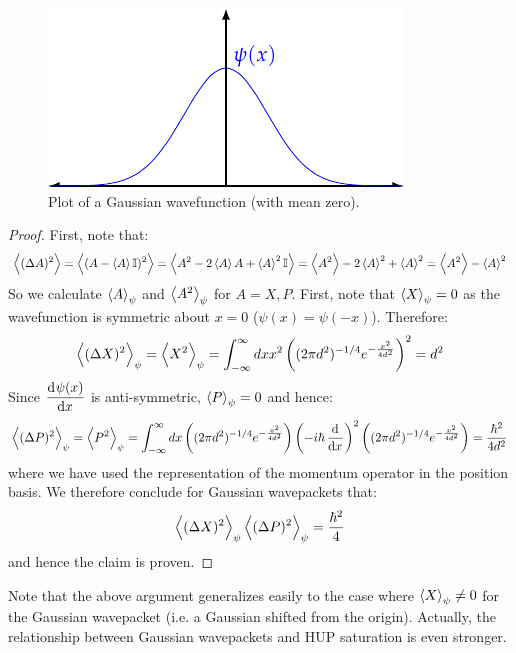 \begin{figure}[htbp]
    \centering
    \includegraphics[]{Images/fig-Gaussian.pdf}
    \caption{Plot of a Gaussian wavefunction (with mean zero).}
    \label{fig-Gaussian}
\end{figure}
\begin{proof}
    First, note that:
    \begin{equation}
        \left< (\Delta A)^2 \right> = \left< (A - \left< A \right>\mathbb{I})^2 \right> = \left< A^2 - 2\left< A \right>A + \left< A \right>^2\mathbb{I} \right> = \left< A^2 \right> - 2\left< A \right>^2 + \left< A \right>^2 = \left< A^2 \right> - \left< A \right>^2
    \end{equation}
    So we calculate $\left< A \right>_\psi$ and $\left< A^2 \right>_\psi$ for $A = X, P$. First, note that $\left< X \right>_\psi = 0$ as the wavefunction is symmetric about $x = 0$ ($\psi(x) = \psi(-x)$). Therefore:
    \begin{equation}
        \left< (\Delta X)^2 \right>_\psi = \left< X^2 \right>_\psi = \int_{-\infty}^\infty dx x^2\left((2\pi d^2)^{-1/4}e^{-\frac{x^2}{4d^2}}\right)^2 = d^2
    \end{equation}
    Since $\dod{\psi(x)}{x}$ is anti-symmetric, $\left< P \right>_\psi = 0$ and hence:
    \begin{equation}
        \avg{(\Delta P)^2}_\psi = \avg{P^2}_\psi = \int_{-\infty}^\infty dx\left((2\pi d^2)^{-1/4}e^{-\frac{x^2}{4d^2}}\right)\left(-i\hbar\dod{}{x}\right)^2\left((2\pi d^2)^{-1/4}e^{-\frac{x^2}{4d^2}}\right) = \frac{\hbar^2}{4d^2}
    \end{equation}
    where we have used the representation of the momentum operator in the position basis. We therefore conclude for Gaussian wavepackets that:
    \begin{equation}
        \left< (\Delta X)^2 \right>_\psi \left< (\Delta P)^2 \right>_\psi = \frac{\hbar^2}{4}
    \end{equation}
    and hence the claim is proven.
\end{proof}

Note that the above argument generalizes easily to the case where $\left< X \right>_\psi \neq 0$ for the Gaussian wavepacket (i.e. a Gaussian shifted from the origin).
Actually, the relationship between Gaussian wavepackets and HUP saturation is even stronger.


